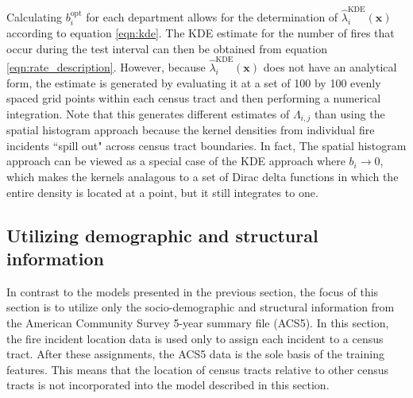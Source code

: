 \documentclass{svjour3}
\begin{document}
  Calculating $b_{i}^{\text{opt}}$ for each department allows for the determination of $\hat\lambda_{i}^\text{KDE}(\textbf{x})$ according to equation \ref{eqn:kde}. The KDE estimate for the number of fires that occur during the test interval can then be obtained from equation \ref{eqn:rate_description}. However, because $\hat\lambda_{i}^\text{KDE}(\textbf{x})$ does not have an analytical form, the estimate is generated by evaluating it at a set of 100 by 100 evenly spaced grid points within each census tract and then performing a numerical integration. Note that this generates different estimates of  $\Lambda_{i,j}$ than using the spatial histogram approach because the kernel densities from individual fire incidents ``spill out" across census tract boundaries. In fact, The spatial histogram approach can be viewed as a special case of the KDE approach where $b_i \rightarrow 0$, which makes the kernels analagous to a set of Dirac delta functions in which the entire density is located at a point, but it still integrates to one.
  
 

  \subsection{Utilizing demographic and structural information}
  In contrast to the models presented in the previous section, the focus of this section is to utilize only the socio-demographic and structural information from the American Community Survey 5-year summary file (ACS5). In this section, the fire incident location data is used only to assign each incident to a census tract. After these assignments, the ACS5 data is the sole basis of the training features. This means that the location of census tracts relative to other census tracts is not incorporated into the model described in this section.
\end{document}
